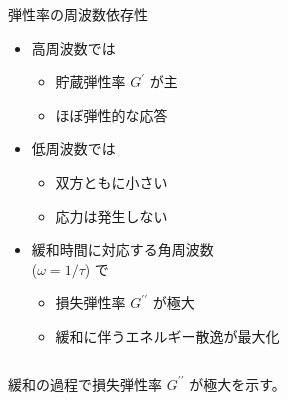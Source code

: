 \documentclass[unicode,12pt]{beamer}%
\begin{document}
\begin{frame}
\begin{columns}[c, onlytextwidth]
				\begin{alertblock}{弾性率の周波数依存性}
					\begin{itemize}
						\item 高周波数では
						\begin{itemize}
							\item 貯蔵弾性率 $G^{\prime}$ が主
							\item ほぼ弾性的な応答
						\end{itemize}
						\item 低周波数では
						\begin{itemize}
							\item 双方ともに小さい
							\item 応力は発生しない
						\end{itemize}
						\item 緩和時間に対応する角周波数\\($\omega=1/\tau$) で
						\begin{itemize}
							\item 損失弾性率 $G^{\prime\prime}$ が極大
							\item 緩和に伴うエネルギー散逸が最大化
						\end{itemize}
					\end{itemize}
				\end{alertblock}
		\end{columns}

		\vspace{3mm}
		\large
		\centering
		\alert{緩和の過程で損失弾性率 $G^{\prime\prime}$ が極大を示す。}
\end{frame}
\end{document}
